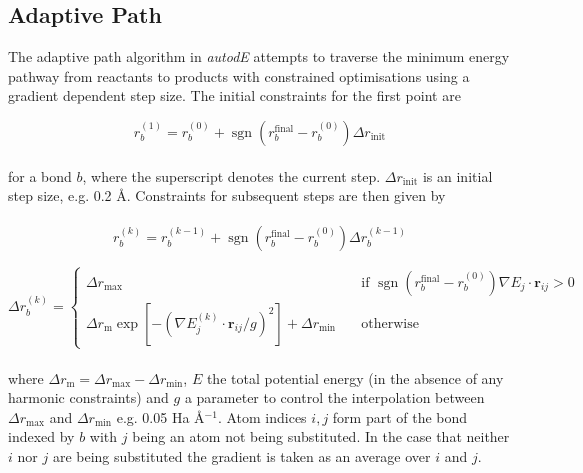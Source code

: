 \documentclass[10pt]{article}
\DeclareMathOperator{\sgn}{sgn}
\begin{document}
\subsection{Adaptive Path}

The adaptive path algorithm in \emph{autodE} attempts to traverse the minimum energy pathway from reactants to products with constrained optimisations using a gradient dependent step size. The initial constraints for the first point are

\begin{equation}
r_b^{(1)} = r_b^{(0)} + \sgn(r_b^\text{final} - r_b^{(0)})\Delta r_\text{init}
\end{equation}
\\
for a bond $b$, where the superscript denotes the current step. $\Delta r_\text{init}$ is an initial step size, e.g. 0.2 Å. Constraints for subsequent steps are then given by
\\\\
\begin{equation}
r_b^{(k)} = r_b^{(k-1)} + \sgn(r_b^\text{final} - r_b^{(0)})\Delta r_b^{(k-1)}
\end{equation}

\begin{equation}
\Delta r_b^{(k)} = 
\begin{cases}
\Delta r_\text{max} \quad &\text{if } \sgn(r_b^\text{final} - r_b^{(0)}) \nabla E_{j} \cdot \boldsymbol{r}_{ij} > 0 \\
\Delta r_\text{m}\exp\left[-\left({\nabla E_{j}^{(k)} \cdot \boldsymbol{r}_{ij}}/{g} \right)^2\right] + \Delta r_\text{min} \quad &\text{otherwise}
\end{cases}
\end{equation}
\\
where $\Delta r_\text{m} = \Delta r_\text{max} - \Delta r_\text{min}$, $E$ the total potential energy (in the absence of any harmonic constraints) and $g$ a parameter to control the interpolation between $\Delta r_\text{max}$ and $\Delta r_\text{min}$ e.g. 0.05 Ha Å$^{-1}$. Atom indices $i, j$ form part of the bond indexed by $b$ with $j$ being an atom not being substituted. In the case that neither $i$ nor $j$ are being substituted the gradient is taken as an average over $i$ and $j$.
\end{document}
